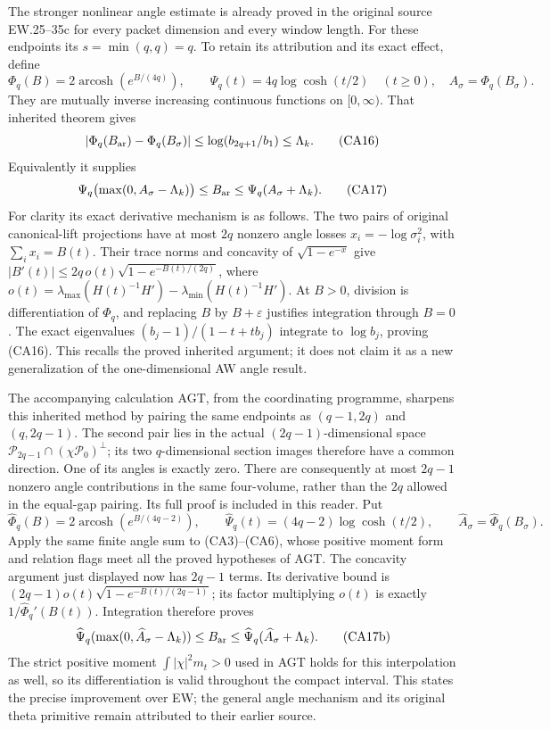 The stronger nonlinear angle estimate is already proved in the original
source EW.25--35c for every packet dimension and every window length.
For these endpoints its $s=\min(q,q)=q$.  To retain its attribution and
its exact effect, define
\[
 \Phi_q(B)=2\operatorname{arcosh}(e^{B/(4q)}),\qquad
 \Psi_q(t)=4q\log\cosh(t/2)\quad(t\ge0),
 \quad A_\sigma=\Phi_q(B_\sigma).
 \tag{CA15}
\]
They are mutually inverse increasing continuous functions on
$[0,\infty)$.  That inherited theorem gives
\[
 |\Phi_q(B_{\rm ar})-\Phi_q(B_\sigma)|
 \le\log(b_{2q+1}/b_1)\le\Lambda_k.
 \tag{CA16}
\]
Equivalently it supplies
\[
 \Psi_q\bigl(\max(0,A_\sigma-\Lambda_k)\bigr)
 \le B_{\rm ar}\le\Psi_q(A_\sigma+\Lambda_k).
 \tag{CA17}
\]
For clarity its exact derivative mechanism is as follows.  The two pairs
of original canonical-lift projections have at most $2q$ nonzero angle
losses $x_i=-\log\sigma_i^2$, with $\sum_i x_i=B(t)$.
Their trace norms and concavity of $\sqrt{1-e^{-x}}$ give
$|B'(t)|\le2q\,o(t)\sqrt{1-e^{-B(t)/(2q)}}$, where
$o(t)=\lambda_{\max}(H(t)^{-1}H')-
\lambda_{\min}(H(t)^{-1}H')$.  At $B>0$, division is differentiation
of $\Phi_q$, and replacing $B$ by $B+\varepsilon$ justifies integration
through $B=0$.  The exact eigenvalues
$(b_j-1)/(1-t+tb_j)$ integrate to $\log b_j$, proving (CA16).
This recalls the proved inherited argument; it does not claim it as a
new generalization of the one-dimensional AW angle result.

The accompanying calculation AGT, from the coordinating programme,
sharpens this inherited method by pairing the same endpoints as
$(q-1,2q)$ and $(q,2q-1)$.  The second pair lies in the actual
$(2q-1)$-dimensional space
$\mathcal P_{2q-1}\cap(\chi\mathcal P_0)^\perp$; its two
$q$-dimensional section images therefore have a common direction.
One of its angles is exactly zero.  There are consequently at most
$2q-1$ nonzero angle contributions in the same four-volume, rather
than the $2q$ allowed in the equal-gap pairing.  Its full proof is
included in this reader.  Put
\[
 \widehat\Phi_q(B)=2\operatorname{arcosh}(e^{B/(4q-2)}),\qquad
 \widehat\Psi_q(t)=(4q-2)\log\cosh(t/2),\qquad
 \widehat A_\sigma=\widehat\Phi_q(B_\sigma).
 \tag{CA17a}
\]
Apply the same finite angle sum to (CA3)--(CA6), whose positive moment
form and relation flags meet all the proved hypotheses of AGT.  The
concavity argument just displayed now has $2q-1$ terms.  Its derivative
bound is $(2q-1)o(t)\sqrt{1-e^{-B(t)/(2q-1)}}$; its factor multiplying
$o(t)$ is exactly $1/\widehat\Phi_q'(B(t))$. Integration therefore proves
\[
 \widehat\Psi_q(\max(0,\widehat A_\sigma-\Lambda_k))
 \le B_{\rm ar}\le\widehat\Psi_q(\widehat A_\sigma+\Lambda_k).
 \tag{CA17b}
\]
The strict positive moment $\int|\chi|^2m_t>0$ used in AGT holds for
this interpolation as well, so its differentiation is valid throughout
the compact interval.  This states the precise improvement over EW;
the general angle mechanism and its original theta primitive remain
attributed to their earlier source.

